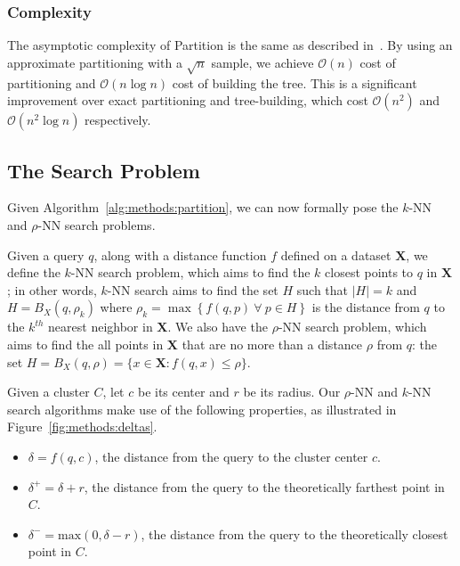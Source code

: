 \subsubsection{Complexity}
\label{sec:methods:clustering:complexity}

The asymptotic complexity of Partition is the same as described in~\cite{ishaq2019clustered}.
By using an approximate partitioning with a $\sqrt{n}$ sample, we achieve $\mathcal{O}(n)$ cost of partitioning and $\mathcal{O}(n \log n)$ cost of building the tree.
This is a significant improvement over exact partitioning and tree-building, which cost $\mathcal{O}(n^2)$ and $\mathcal{O}(n^2 \log n)$ respectively.


\subsection{The Search Problem}
\label{sec:methods:the-search-problem}

Given Algorithm~\ref{alg:methods:partition}, we can now formally pose the $k$-NN and $\rho$-NN search problems.

Given a query $q$, along with a distance function $f$ defined on a dataset $\textbf{X}$, we define the $k$-NN search problem, which aims to find the $k$ closest points to $q$ in $\textbf{X}$;
in other words, $k$-NN search aims to find the set $H$ such that $|H| = k$ and $H = B_X(q, \rho_k)$ where $\rho_k = \max \left\{ f(q, p) \ \forall \ p \in H \right\}$ is the distance from $q$ to the $k^{th}$ nearest neighbor in $\textbf{X}$.
We also have the $\rho$-NN search problem, which aims to find the all points in $\textbf{X}$ that are no more than a distance $\rho$ from $q$: the set $H = B_X(q, \rho) = \{x \in \textbf{X}: f(q, x) \leq \rho \}$.

Given a cluster $C$, let $c$ be its center and $r$ be its radius.
Our $\rho$-NN and $k$-NN search algorithms make use of the following properties, as illustrated in Figure~\ref{fig:methods:deltas}.

\begin{itemize}
    \item $\delta = f(q, c)$, the distance from the query to the cluster center $c$.
    \item $\delta^{+} = \delta + r$, the distance from the query to the theoretically farthest point in $C$.
    \item $\delta^{-} = \text{max}(0, \delta - r)$, the distance from the query to the theoretically closest point in $C$.
\end{itemize}

